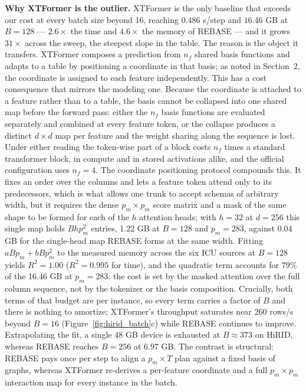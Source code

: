 \textbf{Why XTFormer is the outlier.}
XTFormer is the only baseline that exceeds our cost at every batch size beyond
16, reaching $0.486$ s/step and $16.46$ GB at $B{=}128$ — $2.6\times$ the time
and $4.6\times$ the memory of REBASE — and it grows $31\times$ across the sweep,
the steepest slope in the table. The reason is the object it transfers. XTFormer
composes a prediction from $n_f$ shared basis functions and adapts to a table by
positioning a coordinate in that basis; as noted in Section~2, the coordinate is
assigned to each feature independently. This has a cost consequence that mirrors
the modeling one. Because the coordinate is attached to a feature rather than to
a table, the basis cannot be collapsed into one shared map before the forward
pass: either the $n_f$ basis functions are evaluated separately and combined at
every feature token, or the collapse produces a distinct $d\times d$ map per
feature and the weight sharing along the sequence is lost. Under either reading
the token-wise part of a block costs $n_f$ times a standard transformer block, in
compute and in stored activations alike, and the official configuration uses
$n_f=4$. The coordinate positioning protocol compounds this. It fixes an order
over the columns and lets a feature token attend only to its predecessors, which
is what allows one trunk to accept schemas of arbitrary width, but it requires
the dense $p_m \times p_m$ score matrix and a mask of the same shape to be formed
for each of the $h$ attention heads; with $h=32$ at $d=256$ this single map holds
$B h p_m^2$ entries, 1.22 GB at $B{=}128$ and $p_m{=}283$, against 0.04 GB for the
single-head map REBASE forms at the same width. Fitting $a B p_m + b B p_m^2$ to
the measured memory across the six ICU sources at $B{=}128$ yields $R^2=1.00$
($R^2=0.995$ for time), and the quadratic term accounts for $79\%$ of the
16.46 GB at $p_m{=}283$: the cost is set by the masked attention over the full
column sequence, not by the tokenizer or the basis composition. Crucially, both
terms of that budget are per instance, so every term carries a factor of $B$ and
there is nothing to amortize; XTFormer's throughput saturates near 260 rows/s
beyond $B{=}16$ (Figure~\ref{fig:hirid_batch}c) while REBASE continues to improve.
Extrapolating the fit, a single 48 GB device is exhausted at $B \approx 373$ on
HiRID, whereas REBASE reaches $B{=}256$ at 6.97 GB. The contrast is structural:
REBASE pays once per step to align a $p_m \times T$ plan against a fixed basis of
graphs, whereas XTFormer re-derives a per-feature coordinate and a full
$p_m \times p_m$ interaction map for every instance in the batch.
